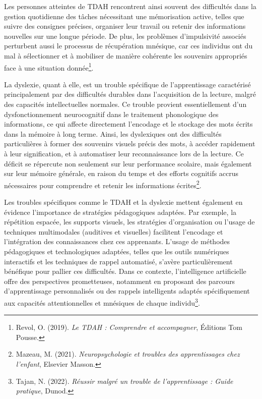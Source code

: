 \documentclass[12pt,a4paper]{report}
\begin{document}
Les personnes atteintes de TDAH rencontrent ainsi souvent des difficultés dans la gestion quotidienne des tâches nécessitant une mémorisation active, telles que suivre des consignes précises, organiser leur travail ou retenir des informations nouvelles sur une longue période. De plus, les problèmes d'impulsivité associés perturbent aussi le processus de récupération mnésique, car ces individus ont du mal à sélectionner et à mobiliser de manière cohérente les souvenirs appropriés face à une situation donnée\footnote{Revol, O. (2019). \textit{Le TDAH : Comprendre et accompagner}, Éditions Tom Pousse.}.

La dyslexie, quant à elle, est un trouble spécifique de l’apprentissage caractérisé principalement par des difficultés durables dans l’acquisition de la lecture, malgré des capacités intellectuelles normales. Ce trouble provient essentiellement d’un dysfonctionnement neurocognitif dans le traitement phonologique des informations, ce qui affecte directement l’encodage et le stockage des mots écrits dans la mémoire à long terme. Ainsi, les dyslexiques ont des difficultés particulières à former des souvenirs visuels précis des mots, à accéder rapidement à leur signification, et à automatiser leur reconnaissance lors de la lecture. Ce déficit se répercute non seulement sur leur performance scolaire, mais également sur leur mémoire générale, en raison du temps et des efforts cognitifs accrus nécessaires pour comprendre et retenir les informations écrites\footnote{Mazeau, M. (2021). \textit{Neuropsychologie et troubles des apprentissages chez l'enfant}, Elsevier Masson.}.

Les troubles spécifiques comme le TDAH et la dyslexie mettent également en évidence l’importance de stratégies pédagogiques adaptées. Par exemple, la répétition espacée, les supports visuels, les stratégies d’organisation ou l’usage de techniques multimodales (auditives et visuelles) facilitent l’encodage et l’intégration des connaissances chez ces apprenants. L’usage de méthodes pédagogiques et technologiques adaptées, telles que les outils numériques interactifs et les techniques de rappel automatisé, s’avère particulièrement bénéfique pour pallier ces difficultés. Dans ce contexte, l'intelligence artificielle offre des perspectives prometteuses, notamment en proposant des parcours d'apprentissage personnalisés ou des rappels intelligents adaptés spécifiquement aux capacités attentionnelles et mnésiques de chaque individu\footnote{Tajan, N. (2022). \textit{Réussir malgré un trouble de l'apprentissage : Guide pratique}, Dunod.}.
\end{document}
